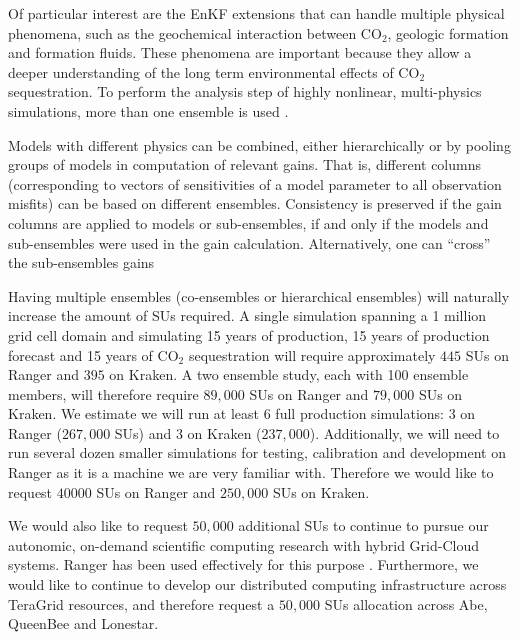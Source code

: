 \documentclass[a4paper,10pt]{article}
\begin{document}
Of particular interest are the EnKF extensions that can handle multiple physical phenomena,
such as the geochemical interaction between CO$_2$, geologic formation and formation fluids.
These phenomena are important because they allow a deeper understanding
of the long term environmental effects of CO$_2$ sequestration. To perform the analysis
step of highly nonlinear, multi-physics simulations, more than one ensemble is used 
\cite{Zhang,White1987,Durlofsky1992,Ballin1993,Gilks96,vanLeeuwen2003}.

Models with different physics can be combined, either hierarchically or by pooling 
groups of models in computation of relevant gains. That is, different  columns (corresponding to  
vectors of sensitivities of a model parameter to all observation misfits) can be based on different 
ensembles. Consistency is preserved if the gain columns are applied to models or sub-ensembles,
if and only if the models and sub-ensembles were used in the gain calculation. Alternatively, one 
can ``cross''  the sub-ensembles gains \cite{Mitchell02,Anderson2007,Michalak2003}

Having multiple ensembles (co-ensembles or hierarchical ensembles) will naturally increase the
amount of SUs required. A single simulation spanning a 1 million grid cell domain and simulating
15 years of production, 15 years of production forecast and 15 years of CO$_2$ sequestration will
require approximately $445$ SUs on Ranger and $395$ on Kraken. A two ensemble study, each with 100 ensemble members, 
will therefore require $89,000$ SUs on Ranger and $79,000$ SUs on Kraken. We estimate we will run at least $6$ full production 
simulations: $3$ on Ranger ($267,000$ SUs)  and $3$ on Kraken ($237,000$). Additionally, we will need to run several dozen smaller simulations for testing, calibration and development on Ranger as it is a machine we are very familiar with. Therefore we would like to request $40000$ SUs on Ranger and $250,000$ SUs on Kraken.

We would also like to request $50,000$ additional SUs to continue to pursue our autonomic,
on-demand scientific computing research with hybrid Grid-Cloud systems. Ranger has been
used effectively for this purpose \cite{Cloud1,Cloud2}. Furthermore, we would like to
continue to develop our distributed computing infrastructure across TeraGrid resources,
and therefore request a $50,000$ SUs allocation across Abe, QueenBee and Lonestar.
\end{document}
